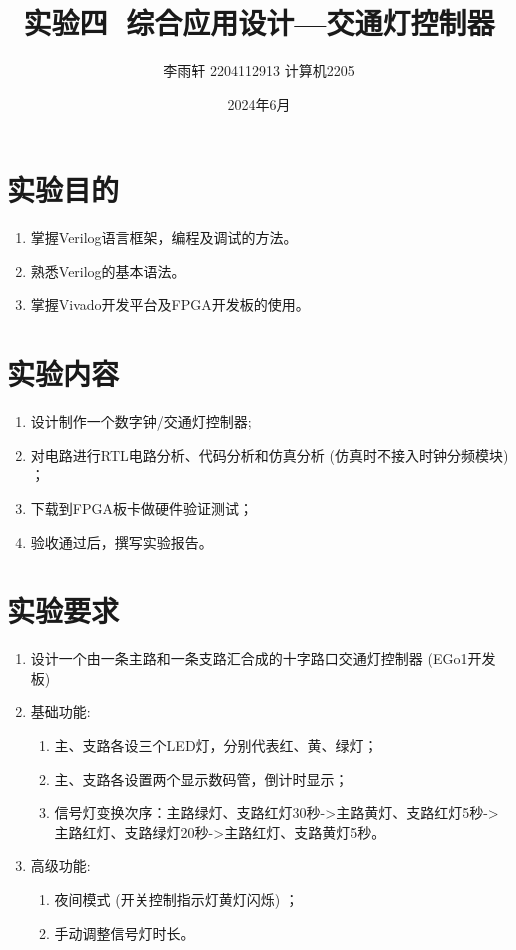 \documentclass[a4,10pt,zihao=-4]{ctexart}
\begin{document}
\title{实验四\,\,\,\,综合应用设计—交通灯控制器}

\author{李雨轩 2204112913 计算机2205}
\date{2024年6月}
\maketitle

\section{实验目的}
\begin{enumerate}
  \item 掌握Verilog语言框架，编程及调试的方法。
  \item 熟悉Verilog的基本语法。
  \item 掌握Vivado开发平台及FPGA开发板的使用。
\end{enumerate}

\section{实验内容}
\begin{enumerate}
    \item 设计制作一个数字钟/交通灯控制器;
    \item 对电路进行RTL电路分析、代码分析和仿真分析 (仿真时不接入时钟分频模块) ；
    \item 下载到FPGA板卡做硬件验证测试；
    \item 验收通过后，撰写实验报告。
\end{enumerate}

\section{实验要求}
\begin{enumerate}
  \item 设计一个由一条主路和一条支路汇合成的十字路口交通灯控制器 (EGo1开发板) 
  \item 基础功能:
  \begin{enumerate}
      \item 主、支路各设三个LED灯，分别代表红、黄、绿灯；
      \item 主、支路各设置两个显示数码管，倒计时显示；
      \item 信号灯变换次序：主路绿灯、支路红灯30秒->主路黄灯、支路红灯5秒->主路红灯、支路绿灯20秒->主路红灯、支路黄灯5秒。
  \end{enumerate}
  \item 高级功能:
  \begin{enumerate}
      \item 夜间模式 (开关控制指示灯黄灯闪烁)  ；
      \item 手动调整信号灯时长。
  \end{enumerate}
\end{enumerate}
\end{document}
